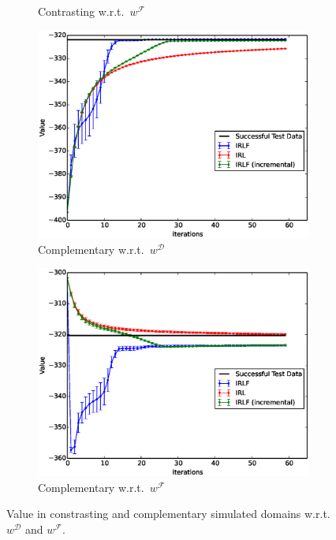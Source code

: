 \documentclass[letterpaper]{article}
\begin{document}
\begin{figure}[t]
\begin{subfigure}[b]{0.475\columnwidth}
    \caption{Contrasting w.r.t.\ $w^\mathcal{F}$}
    \label{fig:toy_taboo_apprentice_contrastive}
  \end{subfigure}  
  \label{fig:contrastive}
  \begin{subfigure}[b]{0.475\columnwidth}
    \includegraphics[trim=0.5cm 1cm 2cm 0,clip=true,width=\textwidth]{images/expert_apprentice_complementary.eps}
    
    \caption{Complementary w.r.t.\ $w^\mathcal{D}$}
    \label{fig:toy_expert_apprentice_complementary}
  \end{subfigure}
  \hfill
  \begin{subfigure}[b]{0.475\columnwidth}
    \includegraphics[trim=0.5cm 1cm 2cm 0,clip=true,width=\textwidth]{images/taboo_apprentice_complementary.eps}
    \caption{Complementary w.r.t.\ $w^\mathcal{F}$}
    \label{fig:toy_taboo_apprentice_complementary}
  \end{subfigure}  
  \caption{Value in constrasting and complementary simulated domains w.r.t.\ $w^\mathcal{D}$ and $w^\mathcal{F}$. }
  \label{fig:complementary}
\end{figure}
\end{document}
